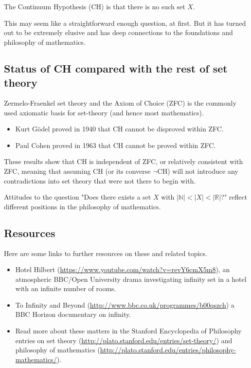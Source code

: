 \documentclass[extrafontsizes, twoside, a4paper]{memoir}
\theoremstyle{plain}%
\theoremstyle{definition}
\theoremstyle{remark}
\begin{document}
The Continuum Hypothesis (CH) is that there is no such set $X$.

This may seem like a straightforward enough question, at first. But it has turned out to be extremely elusive and has deep connections to the foundations and philosophy of mathematics.

\subsection*{Status of CH compared with the rest of set theory}

Zermelo-Fraenkel set theory and the Axiom of Choice (ZFC) is the commonly used axiomatic basis for set-theory (and hence most mathematics).
\begin{itemize}
\item
Kurt G\"odel proved in 1940 that CH cannot be disproved within ZFC.
\item
Paul Cohen proved in 1963 that CH cannot be proved within ZFC.
\end{itemize}
These results show that CH is independent of ZFC, or relatively consistent with ZFC, meaning that assuming CH (or its converse $\neg$CH) will not introduce any contradictions into set theory that were not there to begin with.

Attitudes to the question "Does there exists a set $X$ with $|\mathbb{N}| < |X| < |\mathbb{R}|$?" reflect different positions in the philosophy of mathematics.

\subsection*{Resources}

Here are some links to further resources on these and related topics.
\begin{itemize}
\item
Hotel Hilbert (\url{https://www.youtube.com/watch?v=revY6cmX5m8}), an atmospheric BBC/Open University drama investigating infinity set in a hotel with an infinite number of rooms.
\item
To Infinity and Beyond (\url{http://www.bbc.co.uk/programmes/b00qszch}) a BBC Horizon documentary on infinity.
\item
Read more about these matters in the Stanford Encyclopedia of Philosophy entries on set theory (\url{http://plato.stanford.edu/entries/set-theory/}) and philosophy of mathematics (\url{http://plato.stanford.edu/entries/philosophy-mathematics/}).
\end{itemize}
\cleardoublepage
%
\end{document}
